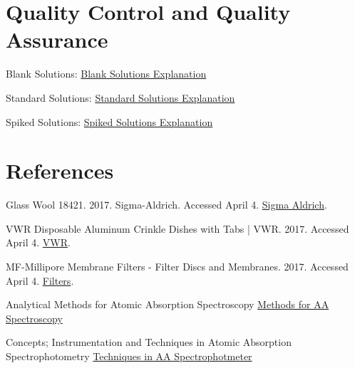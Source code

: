 \documentclass[12pt]{../SOP3_alpha}\usepackage[]{graphicx}\usepackage[]{color}
\begin{document}
\section{Quality Control and Quality Assurance}

\NP Blank Solutions: \href{https://en.wikipedia.org/wiki/Blank_(solution)}{Blank Solutions Explanation}

\NP Standard Solutions: \href{https://en.wikipedia.org/wiki/Standard_solution}{Standard Solutions Explanation}

\NP Spiked Solutions: \href{}{Spiked Solutions Explanation}



\section{References}



\NP Glass Wool 18421. 2017. Sigma-Aldrich. Accessed April 4. \href{http://www.sigmaaldrich.com/catalog/product/sial/18421}{Sigma Aldrich}.

\NP VWR Disposable Aluminum Crinkle Dishes with Tabs | VWR. 2017. Accessed April 4. \href{https://us.vwr.com/store/catalog/product.jsp?product_id=4622693}{VWR}.

\NP MF-Millipore Membrane Filters - Filter Discs and Membranes. 2017. Accessed April 4. \href{https://www.emdmillipore.com/US/en/product/MF-Millipore%E2%84%A2-Membrane-Filters,MM_NF-C152}{Filters}.

\NP Analytical Methods for Atomic Absorption Spectroscopy \href{http://www1.lasalle.edu/~prushan/Intrumental%20Analysis_files/AA-Perkin%20Elmer%20guide%20to%20all!.pdf}{Methods for AA Spectroscopy}

\NP Concepts; Instrumentation and Techniques in Atomic Absorption Spectrophotometry \href{http://www.ufjf.br/baccan/files/2011/05/AAS-Perkin1.pdf}{Techniques in AA Spectrophotmeter}
\end{document}
